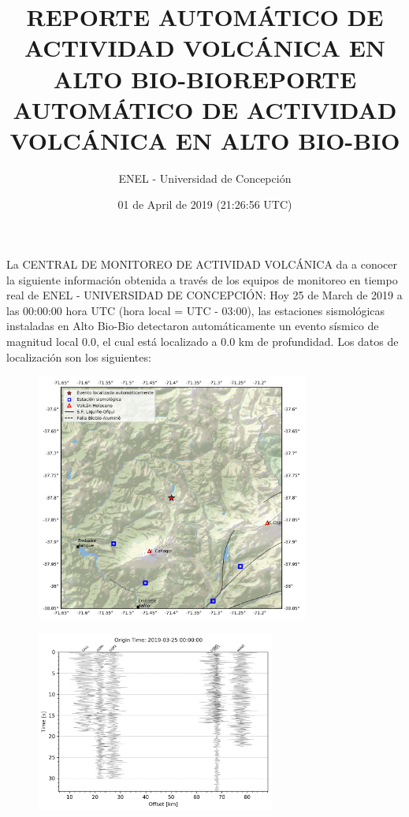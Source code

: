 \documentclass[a4paper,12pt]{article}%
\title{REPORTE AUTOMÁTICO DE ACTIVIDAD VOLCÁNICA EN ALTO BIO{-}BIO}%
\title{REPORTE AUTOMÁTICO DE ACTIVIDAD VOLCÁNICA EN ALTO BIO{-}BIO}%
\author{ENEL {-} Universidad de Concepción}%
\date{01 de April de 2019 (21:26:56 UTC)}%
\begin{document}
%
\pagestyle{empty}%
\normalsize%
\maketitle%
La CENTRAL DE MONITOREO DE ACTIVIDAD VOLCÁNICA da a conocer la siguiente información obtenida a través de los equipos de monitoreo en tiempo real de ENEL {-} UNIVERSIDAD DE CONCEPCIÓN:\newline%
\newline%
%
Hoy 25 de March de 2019 a las 00:00:00 hora UTC (hora local = UTC {-} 03:00), las estaciones sismológicas instaladas en Alto Bio{-}Bio detectaron automáticamente un evento sísmico de magnitud local 0.0, el cual está localizado a 0.0 km de profundidad. Los datos de localización son los siguientes: \newline%
\newline%
%


\begin{figure}[ht!]%
\centering%
\includegraphics[width=0.8\textwidth]{figs/map_automatic.jpg}%
\end{figure}

%


\begin{figure}[ht!]%
\centering%
\includegraphics[width=0.7\textwidth]{figs/waveforms_automatic.jpg}%
\end{figure}
\end{document}
